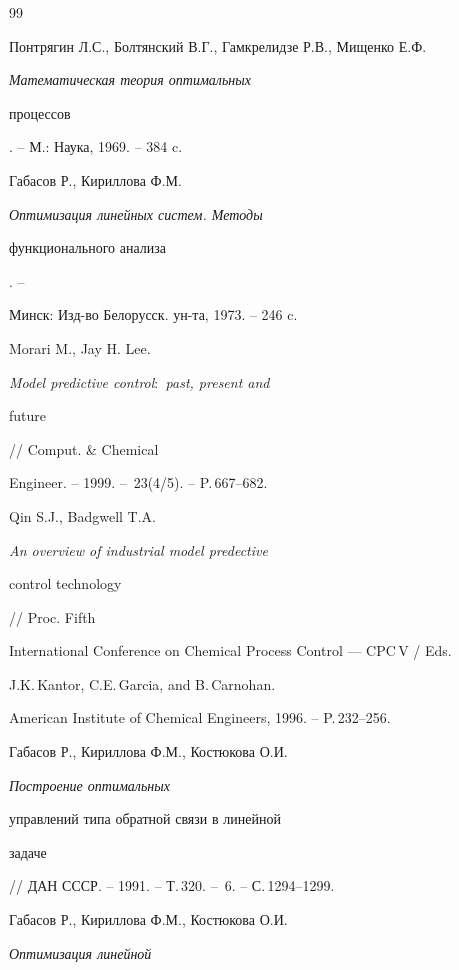 \begin{thebibliography}{99}







Понтрягин Л.С., Болтянский В.Г., Гамкрелидзе Р.В., Мищенко Е.Ф.


{\it Математическая теория оптимальных


процессов}. -- М.: Наука, 1969. -- 384 c.







Габасов Р., Кириллова Ф.М. {\it Оптимизация линейных систем. Методы


функционального анализа}. --


Минск: Изд-во Белорусск. ун-та, 1973. -- 246 c.







Morari M., Jay H. Lee. {\it Model predictive control$:$ past, present and


future} // Comput. \& Chemical


Engineer. -- 1999. -- \No\,23(4/5). -- P.\,667--682.







Qin S.J., Badgwell T.A. {\it An overview of industrial model predective


control technology} // Proc. Fifth


International Conference on Chemical Process Control --- CPC\,V / Eds.


J.K.\,Kantor, C.E.\,Garcia, and B.\,Carnohan.


American Institute of Chemical Engineers, 1996. -- P.\,232--256.







Габасов Р., Кириллова Ф.М., Костюкова О.И. {\it Построение оптимальных


управлений типа обратной связи в линейной


задаче} // ДАН СССР. -- 1991. -- Т.\,320. -- \No\,6. -- С.\,1294--1299.







Габасов Р., Кириллова Ф.М., Костюкова О.И. {\it Оптимизация линейной


}
\end{thebibliography}
